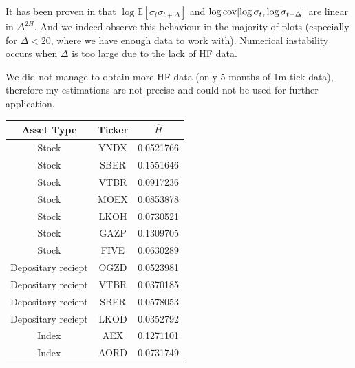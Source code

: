         It has been proven in \cite{GatheralRosenbaum2014} that $\log\mathbb{E}[\sigma_{t}\sigma_{t+\Delta}]$ and $\log \operatorname*{cov}[\log\sigma_t, \log\sigma_{t+\Delta}]$ are linear in $\Delta^{2H}$. And we indeed observe this behaviour in the majority of plots (especially for $\Delta < 20$, where we have enough data to work with).
        Numerical instability occurs when $\Delta$ is too large due to the lack of HF data.


        \begin{nb}
            We did not manage to obtain more HF data (only 5 months of 1m-tick data), therefore my estimations are not precise and could 
            not be used for further application.
        \end{nb}

        \begin{table}[htbp]
            \centering
            \begin{tabular}{|c|c|c|}
                \hline
                Asset Type               & Ticker & $\hat H$  \\ \hline
                \hline
                Stock                    & YNDX   & 0.0521766 \\ \hline
                Stock                    & SBER   & 0.1551646 \\ \hline
                Stock                    & VTBR   & 0.0917236 \\ \hline
                Stock                    & MOEX   & 0.0853878 \\ \hline
                Stock                    & LKOH   & 0.0730521 \\ \hline
                Stock                    & GAZP   & 0.1309705 \\ \hline
                Stock                    & FIVE   & 0.0630289 \\ \hline
                \hline
                Depositary reciept       & OGZD   & 0.0523981 \\ \hline
                Depositary reciept       & VTBR   & 0.0370185 \\ \hline
                Depositary reciept       & SBER   & 0.0578053 \\ \hline
                Depositary reciept       & LKOD   & 0.0352792 \\ \hline
                \hline
                Index                    &  AEX & 0.1271101 \\ \hline
                Index                    &  AORD & 0.0731749 \\ \hline

\end{tabular}
\end{table}
